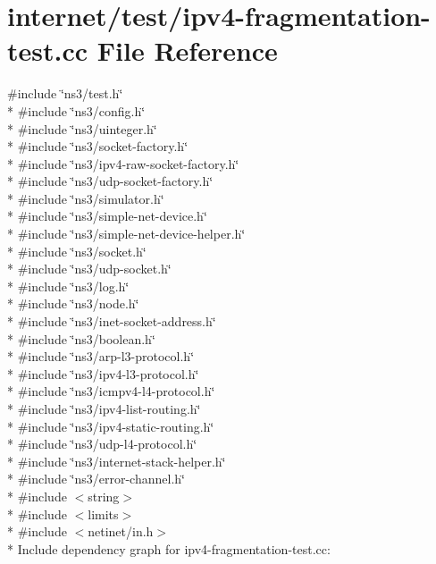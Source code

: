 \hypertarget{ipv4-fragmentation-test_8cc}{}\section{internet/test/ipv4-\/fragmentation-\/test.cc File Reference}
\label{ipv4-fragmentation-test_8cc}
{\ttfamily \#include \char`\"{}ns3/test.\+h\char`\"{}}\\*
{\ttfamily \#include \char`\"{}ns3/config.\+h\char`\"{}}\\*
{\ttfamily \#include \char`\"{}ns3/uinteger.\+h\char`\"{}}\\*
{\ttfamily \#include \char`\"{}ns3/socket-\/factory.\+h\char`\"{}}\\*
{\ttfamily \#include \char`\"{}ns3/ipv4-\/raw-\/socket-\/factory.\+h\char`\"{}}\\*
{\ttfamily \#include \char`\"{}ns3/udp-\/socket-\/factory.\+h\char`\"{}}\\*
{\ttfamily \#include \char`\"{}ns3/simulator.\+h\char`\"{}}\\*
{\ttfamily \#include \char`\"{}ns3/simple-\/net-\/device.\+h\char`\"{}}\\*
{\ttfamily \#include \char`\"{}ns3/simple-\/net-\/device-\/helper.\+h\char`\"{}}\\*
{\ttfamily \#include \char`\"{}ns3/socket.\+h\char`\"{}}\\*
{\ttfamily \#include \char`\"{}ns3/udp-\/socket.\+h\char`\"{}}\\*
{\ttfamily \#include \char`\"{}ns3/log.\+h\char`\"{}}\\*
{\ttfamily \#include \char`\"{}ns3/node.\+h\char`\"{}}\\*
{\ttfamily \#include \char`\"{}ns3/inet-\/socket-\/address.\+h\char`\"{}}\\*
{\ttfamily \#include \char`\"{}ns3/boolean.\+h\char`\"{}}\\*
{\ttfamily \#include \char`\"{}ns3/arp-\/l3-\/protocol.\+h\char`\"{}}\\*
{\ttfamily \#include \char`\"{}ns3/ipv4-\/l3-\/protocol.\+h\char`\"{}}\\*
{\ttfamily \#include \char`\"{}ns3/icmpv4-\/l4-\/protocol.\+h\char`\"{}}\\*
{\ttfamily \#include \char`\"{}ns3/ipv4-\/list-\/routing.\+h\char`\"{}}\\*
{\ttfamily \#include \char`\"{}ns3/ipv4-\/static-\/routing.\+h\char`\"{}}\\*
{\ttfamily \#include \char`\"{}ns3/udp-\/l4-\/protocol.\+h\char`\"{}}\\*
{\ttfamily \#include \char`\"{}ns3/internet-\/stack-\/helper.\+h\char`\"{}}\\*
{\ttfamily \#include \char`\"{}ns3/error-\/channel.\+h\char`\"{}}\\*
{\ttfamily \#include $<$string$>$}\\*
{\ttfamily \#include $<$limits$>$}\\*
{\ttfamily \#include $<$netinet/in.\+h$>$}\\*
Include dependency graph for ipv4-\/fragmentation-\/test.cc\+:
